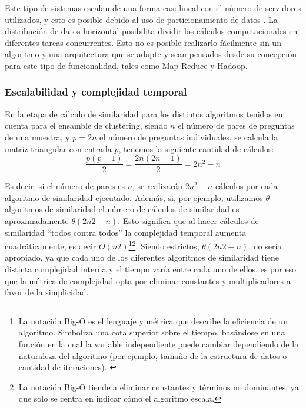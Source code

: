 \bigskip Este tipo de sistemas escalan de una forma casi lineal con el número de servidores utilizados, y esto es posible debido al uso de particionamiento de datos \citep{pokorny2013nosql}. La distribución de datos horizontal posibilita dividir los cálculos computacionales en diferentes tareas concurrentes. Esto no es posible realizarlo fácilmente sin un algoritmo y una arquitectura que se adapte y sean pensados desde su concepción para este tipo de funcionalidad, tales como Map-Reduce y Hadoop.

\subsubsection{Escalabilidad y complejidad temporal}
En la etapa de cálculo de similaridad para los distintos algoritmos tenidos en cuenta para el ensamble de clustering, siendo \(n\) el número de pares de preguntas de una muestra, y \(p = 2n\) el número de preguntas individuales, se calcula la matriz triangular con entrada \(p\), tenemos la siguiente cantidad de cálculos:
\[\frac{p(p-1)}{2} = \frac{2n(2n-1)}{2} = 2n^2-n\]

Es decir, si el número de pares es \(n\), se realizarán \(2n^2-n\) cálculos por cada algoritmo de similaridad ejecutado. Además, si, por ejemplo, utilizamos \(\theta\) algoritmos de similaridad el número de cálculos de similaridad es aproximadamente \(\theta(2n2-n)\). Esto significa que al hacer cálculos de similaridad “todos contra todos” la complejidad temporal aumenta cuadráticamente, es decir \(O(n2)\)\footnote{La notación Big-O es el lenguaje y métrica que describe la eficiencia de un algoritmo. Simboliza una cota superior sobre el tiempo, basándose en una función en la cual la variable independiente puede cambiar dependiendo de la naturaleza del algoritmo (por ejemplo, tamaño de la estructura de datos o cantidad de iteraciones). \citep{cormen2009introduction}}\footnote{La notación Big-O tiende a eliminar constantes y términos no dominantes, ya que solo se centra en indicar cómo el algoritmo escala. }. Siendo estrictos, \(\theta(2n2-n)\). no sería apropiado, ya que cada uno de los diferentes algoritmos de similaridad tiene distinta complejidad interna y el tiempo varía entre cada uno de ellos, es por eso que la métrica de complejidad opta por eliminar constantes y multiplicadores a favor de la simplicidad.


